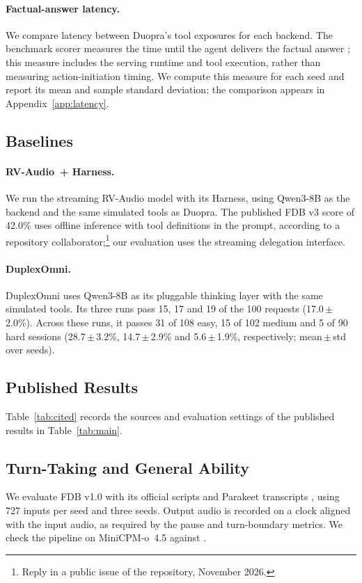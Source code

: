 \paragraph{Factual-answer latency.}
We compare latency between Duopra's tool exposures for each backend.
The benchmark scorer measures the time until the agent delivers the factual answer \citep{lin2026fdbv3}; this measure includes the serving runtime and tool execution, rather than measuring action-initiation timing.
We compute this measure for each seed and report its mean and sample standard deviation; the comparison appears in Appendix~\ref{app:latency}.

\subsection{Baselines}
\paragraph{RV-Audio~+ Harness.}
We run the streaming RV-Audio model with its Harness, using Qwen3-8B as the backend and the same simulated tools as Duopra.
The published FDB v3 score of 42.0\% \citep[Table~7]{venus2026realtimevenus} uses offline inference with tool definitions in the prompt, according to a repository collaborator;\footnote{Reply in a public issue of the repository, November 2026.} our evaluation uses the streaming delegation interface.

\paragraph{DuplexOmni.}
DuplexOmni \citep{huang2026duplexomni} uses Qwen3-8B as its pluggable thinking layer with the same simulated tools.
Its three runs pass 15, 17 and 19 of the 100 requests (17.0\,$\pm$\,2.0\%).
Across these runs, it passes 31 of 108 easy, 15 of 102 medium and 5 of 90 hard sessions (28.7\,$\pm$\,3.2\%, 14.7\,$\pm$\,2.9\% and 5.6\,$\pm$\,1.9\%, respectively; mean\,$\pm$\,std over seeds).

\subsection{Published Results}
\label{app:published}

Table~\ref{tab:cited} records the sources and evaluation settings of the published results in Table~\ref{tab:main}.


\subsection{Turn-Taking and General Ability}

We evaluate FDB v1.0 \citep{lin2025fullduplexbench} with its official scripts and Parakeet transcripts \citep{rekesh2023fastconformer}, using 727 inputs per seed and three seeds.
Output audio is recorded on a clock aligned with the input audio, as required by the pause and turn-boundary metrics.
We check the pipeline on MiniCPM-o~4.5 \citep{cui2026minicpmo45} against \citet[Table~1]{adaptduplex2026}.


